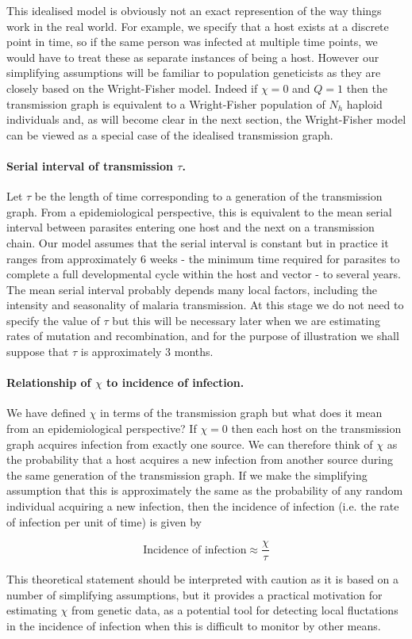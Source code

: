 \documentclass[_main.tex]{subfiles}
\begin{document}
This idealised model is obviously not an exact represention of the way things work in the real world.  For example, we specify that a host exists at a discrete point in time, so if the same person was infected at multiple time points, we would have to treat these as separate instances of being a host.  However our simplifying assumptions will be familiar to population geneticists as they are closely based on the Wright-Fisher model.  Indeed if $\chi=0$ and $Q = 1$ then the transmission graph is equivalent to a Wright-Fisher population of $N_h$ haploid individuals and, as will become clear in the next section, the Wright-Fisher model can be viewed as a special case of the idealised transmission graph.

\paragraph{Serial interval of transmission $\tau$.}  \label{main_serial_interval}  Let $\tau$ be the length of time corresponding to a generation of the transmission graph.  From a epidemiological perspective, this is equivalent to the mean serial interval between parasites entering one host and the next on a transmission chain.  Our model assumes that the serial interval is constant but in practice it ranges from approximately 6 weeks - the minimum time required for parasites to complete a full developmental cycle within the host and vector - to several years.  The mean serial interval probably depends many local factors, including the intensity and seasonality of malaria transmission. At this stage we do not need to specify the value of $\tau$ but this will be necessary later when we are estimating rates of mutation and recombination, and for the purpose of illustration we shall suppose that $\tau$ is approximately 3 months.

\paragraph{Relationship of $\chi$ to incidence of infection.} We have defined $\chi$ in terms of the transmission graph but what does it mean from an epidemiological perspective?  If $\chi = 0$ then each host on the transmission graph acquires infection from exactly one source.  We can therefore think of $\chi$ as the probability that a host acquires a new infection from another source during the same generation of the transmission graph.  If we make the simplifying assumption that this is approximately the same as the probability of any random individual acquiring a new infection, then the incidence of infection (i.e. the rate of infection per unit of time) is given by

\begin{equation}
\text{Incidence of infection} \approx \frac{\chi}{\tau}
\label{main:chi_tau} 
\end{equation}

This theoretical statement should be interpreted with caution as it is based on a number of simplifying assumptions, but it provides a practical motivation for estimating $\chi$ from genetic data, as a potential tool for detecting local fluctations in the incidence of infection when this is difficult to monitor by other means.
\end{document}
